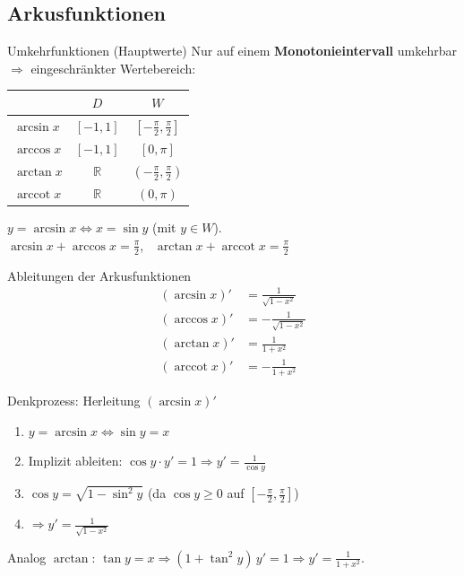 \documentclass[a4paper, fontsize=7pt]{scrartcl}
\def\R{\mathbb{R}}  %
\renewcommand*{\arraystretch}{1.5}  %
\begin{document}
\subsection{Arkusfunktionen}

\begin{mainbox}{Umkehrfunktionen (Hauptwerte)}
Nur auf einem \textbf{Monotonieintervall} umkehrbar $\Rightarrow$ eingeschränkter
Wertebereich:
\renewcommand*{\arraystretch}{1.5}
\setlength{\tabcolsep}{4pt}
\begin{center}
\begin{tabular}{l|c|c}
 & $D$ & $W$ \\
\hline
$\arcsin x$ & $[-1, 1]$ & $[-\frac{\pi}{2}, \frac{\pi}{2}]$ \\
$\arccos x$ & $[-1, 1]$ & $[0, \pi]$ \\
$\arctan x$ & $\R$ & $(-\frac{\pi}{2}, \frac{\pi}{2})$ \\
$\operatorname{arccot} x$ & $\R$ & $(0, \pi)$ \\
\end{tabular}
\end{center}
$y = \arcsin x \iff x = \sin y$ (mit $y \in W$).\\
$\arcsin x + \arccos x = \frac{\pi}{2}$, \ $\arctan x + \operatorname{arccot} x = \frac{\pi}{2}$
\end{mainbox}

\begin{mainbox}{Ableitungen der Arkusfunktionen}
\begin{align*}
(\arcsin x)' &= \frac{1}{\sqrt{1 - x^2}} \\
(\arccos x)' &= -\frac{1}{\sqrt{1 - x^2}} \\
(\arctan x)' &= \frac{1}{1 + x^2} \\
(\operatorname{arccot} x)' &= -\frac{1}{1 + x^2}
\end{align*}
\end{mainbox}

\begin{subbox}{Denkprozess: Herleitung $(\arcsin x)'$}
\begin{enumerate}
    \item $y = \arcsin x \iff \sin y = x$
    \item Implizit ableiten: $\cos y \cdot y' = 1 \Rightarrow y' = \frac{1}{\cos y}$
    \item $\cos y = \sqrt{1 - \sin^2 y}$ (da $\cos y \geq 0$ auf $[-\frac{\pi}{2}, \frac{\pi}{2}]$)
    \item $\Rightarrow y' = \frac{1}{\sqrt{1 - x^2}}$
\end{enumerate}
Analog $\arctan$: $\tan y = x \Rightarrow (1 + \tan^2 y)\,y' = 1 \Rightarrow y' = \frac{1}{1 + x^2}$.
\end{subbox}
\end{document}
